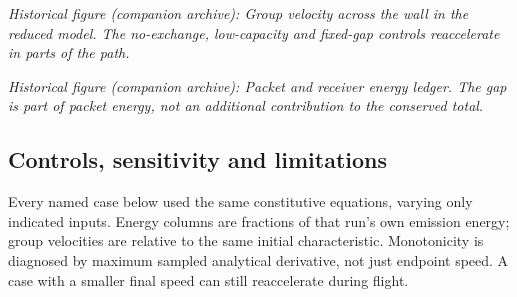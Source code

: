 \documentclass[
  11pt,
  twoside]{article}
\begin{document}
\emph{Historical figure (companion archive): Group velocity across the
wall in the reduced model. The no-exchange, low-capacity and fixed-gap
controls reaccelerate in parts of the path.}

\emph{Historical figure (companion archive): Packet and receiver energy
ledger. The gap is part of packet energy, not an additional contribution
to the conserved total.}

\subsection{Controls, sensitivity and
limitations}\label{controls-sensitivity-and-limitations}

Every named case below used the same constitutive equations, varying
only indicated inputs. Energy columns are fractions of that run's own
emission energy; group velocities are relative to the same initial
characteristic. Monotonicity is diagnosed by maximum sampled analytical
derivative, not just endpoint speed. A case with a smaller final speed
can still reaccelerate during flight.
\end{document}

